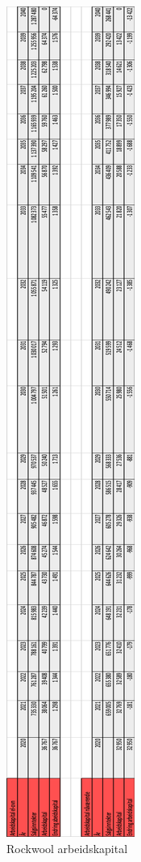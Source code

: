 \begin{figure}[H]
\centering
\includegraphics [scale=0.8]{appendiks/bilder/arbeidskapital.png}
\caption{Rockwool arbeidskapital}
\label{fig:arbeidskapital}
\end{figure}


